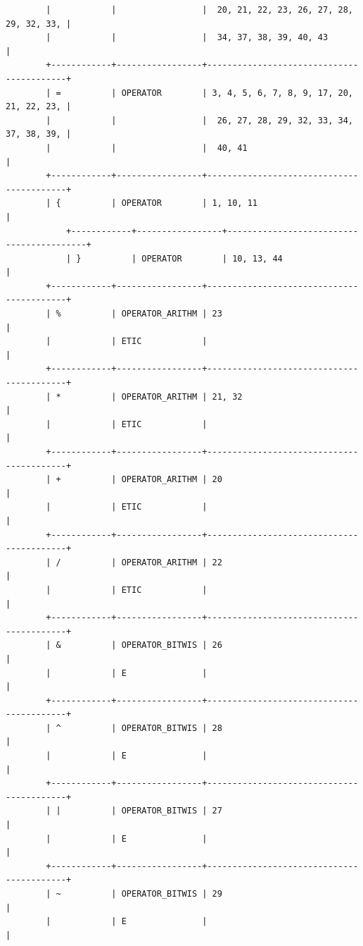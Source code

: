 \documentclass[a4paper,12pt]{article}
\begin{document}
\begin{flushleft}
\begin{verbatim}
		|            |                 |  20, 21, 22, 23, 26, 27, 28, 29, 32, 33, |
		|            |                 |  34, 37, 38, 39, 40, 43                  |
		+------------+-----------------+------------------------------------------+
		| =          | OPERATOR        | 3, 4, 5, 6, 7, 8, 9, 17, 20, 21, 22, 23, |
		|            |                 |  26, 27, 28, 29, 32, 33, 34, 37, 38, 39, |
		|            |                 |  40, 41                                  |
		+------------+-----------------+------------------------------------------+
		| {          | OPERATOR        | 1, 10, 11                                |
			+------------+-----------------+------------------------------------------+
			| }          | OPERATOR        | 10, 13, 44                               |
		+------------+-----------------+------------------------------------------+
		| %          | OPERATOR_ARITHM | 23                                       |
		|            | ETIC            |                                          |
		+------------+-----------------+------------------------------------------+
		| *          | OPERATOR_ARITHM | 21, 32                                   |
		|            | ETIC            |                                          |
		+------------+-----------------+------------------------------------------+
		| +          | OPERATOR_ARITHM | 20                                       |
		|            | ETIC            |                                          |
		+------------+-----------------+------------------------------------------+
		| /          | OPERATOR_ARITHM | 22                                       |
		|            | ETIC            |                                          |
		+------------+-----------------+------------------------------------------+
		| &          | OPERATOR_BITWIS | 26                                       |
		|            | E               |                                          |
		+------------+-----------------+------------------------------------------+
		| ^          | OPERATOR_BITWIS | 28                                       |
		|            | E               |                                          |
		+------------+-----------------+------------------------------------------+
		| |          | OPERATOR_BITWIS | 27                                       |
		|            | E               |                                          |
		+------------+-----------------+------------------------------------------+
		| ~          | OPERATOR_BITWIS | 29                                       |
		|            | E               |                                          |

\end{verbatim}
\end{flushleft}
\end{document}
